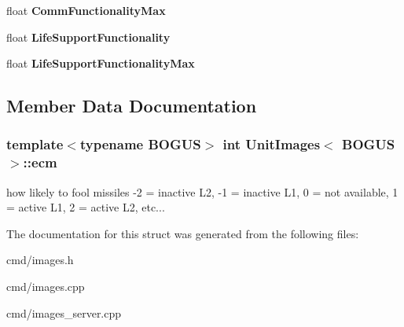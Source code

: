 \begin{DoxyCompactItemize}
\item 
float {\bfseries Comm\+Functionality\+Max}\hypertarget{structUnitImages_af186805d7fdbc80fd001ac42977b9ac7}{}\label{structUnitImages_af186805d7fdbc80fd001ac42977b9ac7}

\item 
float {\bfseries Life\+Support\+Functionality}\hypertarget{structUnitImages_af7f5198b064c6a70e5bb25babb166793}{}\label{structUnitImages_af7f5198b064c6a70e5bb25babb166793}

\item 
float {\bfseries Life\+Support\+Functionality\+Max}\hypertarget{structUnitImages_aa53f48cf0a1de8d73feafe8a606e00d1}{}\label{structUnitImages_aa53f48cf0a1de8d73feafe8a606e00d1}

\end{DoxyCompactItemize}


\subsection{Member Data Documentation}
\subsubsection[{\texorpdfstring{ecm}{ecm}}]{\setlength{\rightskip}{0pt plus 5cm}template$<$typename B\+O\+G\+US$>$ int {\bf Unit\+Images}$<$ B\+O\+G\+US $>$\+::ecm}\hypertarget{structUnitImages_a2924a67297f32b1d2f2724ce3c421934}{}\label{structUnitImages_a2924a67297f32b1d2f2724ce3c421934}
how likely to fool missiles -\/2 = inactive L2, -\/1 = inactive L1, 0 = not available, 1 = active L1, 2 = active L2, etc... 

The documentation for this struct was generated from the following files\+:\begin{DoxyCompactItemize}
\item 
cmd/images.\+h\item 
cmd/images.\+cpp\item 
cmd/images\+\_\+server.\+cpp\end{DoxyCompactItemize}
